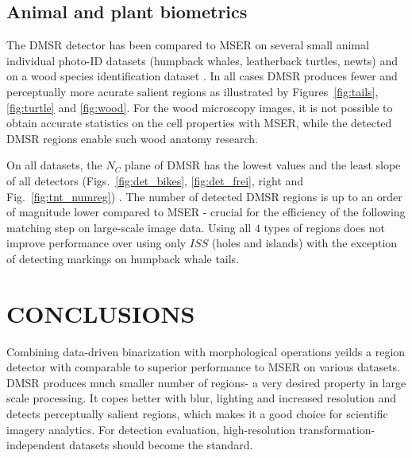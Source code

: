 \documentclass{article}
\begin{document}
\subsection{Animal and plant biometrics}
\label{ssec:bio}
The DMSR detector has been compared to MSER on several small animal individual photo-ID datasets (humpback whales, leatherback turtles, newts) and on a wood species identification dataset \cite{RangHumpb06, PauwelsZB08, wood}. In all cases DMSR produces fewer and perceptually more acurate salient regions as illustrated by Figures~\ref{fig:tails}, \ref{fig:turtle} and \ref{fig:wood}. For the wood microscopy images, it is not possible to obtain accurate statistics on the cell properties with MSER, while the detected DMSR regions enable such wood anatomy research.

On all datasets, the $N_C$ plane of DMSR has the lowest values and the least slope of all detectors (Figs.~\ref{fig:det_bikes}, \ref{fig:det_frei}, right and Fig.~\ref{fig:tnt_numreg}) \cite{elena_ranguelova_2016_45156}. 
The number of detected DMSR regions is up to an order of magnitude lower compared to MSER - crucial for the efficiency of the following matching step on large-scale image data.
Using all $4$ types of regions does not improve performance over using only $ISS$ (holes and islands) with the exception of detecting markings on humpback whale tails. 

\section{CONCLUSIONS}
Combining data-driven binarization with morphological operations yeilds a region detector with comparable to superior performance to MSER on various datasets. DMSR produces much smaller number of regions- a very desired property in large scale processing. It copes better with blur, lighting and increased resolution and detects perceptually salient regions, which makes it a good choice for scientific imagery analytics. 
For detection evaluation, high-resolution transformation-independent datasets should become the standard.
\label{sec:concl}










\end{document}
